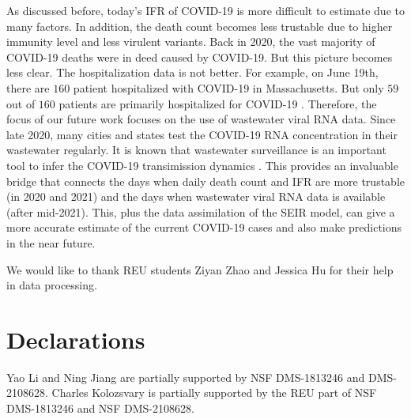 \documentclass[sn-mathphys,Numbered]{sn-jnl}
\begin{document}
As discussed before, today's IFR of COVID-19 is more difficult to
estimate due to many factors. In addition, the death count becomes
less trustable due to higher immunity level and less virulent
variants. Back in 2020, the vast majority of COVID-19 deaths were in
deed caused by COVID-19. But this picture becomes less clear. The
hospitalization data is not better. For example, on June 19th, there are $160$ patient hospitalized with COVID-19 in Massachusetts. But only $59$ out of $160$ patients are primarily hospitalized for COVID-19 \cite{masscovid}. Therefore, the focus of our future work focuses on the use
of wastewater viral RNA data. Since late 2020, many cities and states
test the COVID-19 RNA concentration in their wastewater
regularly. It is known that wastewater surveillance is an important tool to infer the COVID-19 transimission dynamics \cite{wastewater1, wastewater2}. This provides an invaluable bridge that connects the days
when daily death count and IFR are more trustable (in 2020 and 2021)
and the days when wastewater viral RNA data is available (after
mid-2021). This, plus the data assimilation of the SEIR model, can
give a more accurate estimate of the current COVID-19 cases and also
make predictions in the near future.

We would like to thank REU students Ziyan Zhao and Jessica Hu for their help in
data processing. 


\section*{Declarations}

Yao Li and Ning Jiang are partially supported by NSF DMS-1813246 and
DMS-2108628. Charles Kolozsvary is partially supported by the REU part of NSF DMS-1813246 and NSF DMS-2108628.

\newpage
\end{document}
